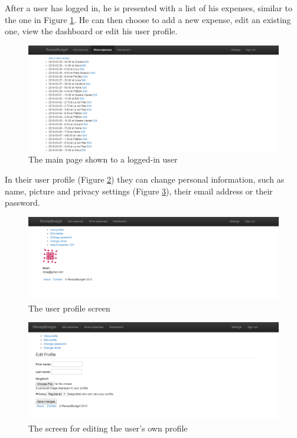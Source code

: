 After a user has logged in, he is presented with a list of his expenses, similar to the one in Figure \ref{fig:expense_list}. He can then choose to add a new expense, edit an existing one, view the dashboard or edit his user profile. 
\begin{figure}[htdp]
\begin{center}
\includegraphics[width=\linewidth]{img/manual/expense_list.png}
\caption{\label{fig:expense_list}
The main page shown to a logged-in user}
\end{center}
\end{figure}

In their user profile (Figure \ref{fig:user_profile}) they can change personal information, such as name, picture and privacy settings (Figure \ref{fig:profile_edit}), their email address or their password.

\begin{figure}[htdp]
\begin{center}
\includegraphics[width=\linewidth]{img/manual/user_profile.png}
\caption{\label{fig:user_profile}
The user profile screen}
\end{center}
\end{figure}

\begin{figure}[htdp]
\begin{center}
\includegraphics[width=\linewidth]{img/manual/profile_edit.png}
\caption{\label{fig:profile_edit}
The screen for editing the user's own profile}
\end{center}
\end{figure}

